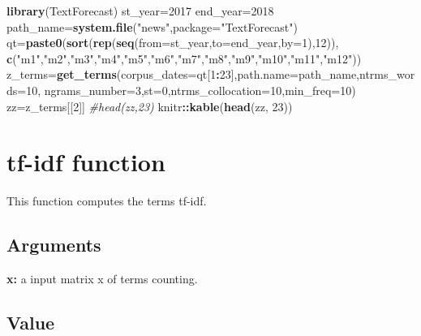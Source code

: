 \documentclass[]{article}
\newenvironment{Shaded}{\begin{snugshade}}{\end{snugshade}}
\newcommand{\KeywordTok}[1]{\textcolor[rgb]{0.13,0.29,0.53}{\textbf{#1}}}
\newcommand{\DataTypeTok}[1]{\textcolor[rgb]{0.13,0.29,0.53}{#1}}
\newcommand{\DecValTok}[1]{\textcolor[rgb]{0.00,0.00,0.81}{#1}}
\newcommand{\StringTok}[1]{\textcolor[rgb]{0.31,0.60,0.02}{#1}}
\newcommand{\CommentTok}[1]{\textcolor[rgb]{0.56,0.35,0.01}{\textit{#1}}}
\newcommand{\OperatorTok}[1]{\textcolor[rgb]{0.81,0.36,0.00}{\textbf{#1}}}
\newcommand{\NormalTok}[1]{#1}
\begin{document}
\begin{Shaded}
\begin{Highlighting}[]
\KeywordTok{library}\NormalTok{(TextForecast)}
\NormalTok{st_year=}\DecValTok{2017}
\NormalTok{end_year=}\DecValTok{2018}
\NormalTok{path_name=}\KeywordTok{system.file}\NormalTok{(}\StringTok{"news"}\NormalTok{,}\DataTypeTok{package=}\StringTok{"TextForecast"}\NormalTok{)}
\NormalTok{qt=}\KeywordTok{paste0}\NormalTok{(}\KeywordTok{sort}\NormalTok{(}\KeywordTok{rep}\NormalTok{(}\KeywordTok{seq}\NormalTok{(}\DataTypeTok{from=}\NormalTok{st_year,}\DataTypeTok{to=}\NormalTok{end_year,}\DataTypeTok{by=}\DecValTok{1}\NormalTok{),}\DecValTok{12}\NormalTok{)),}
\KeywordTok{c}\NormalTok{(}\StringTok{"m1"}\NormalTok{,}\StringTok{"m2"}\NormalTok{,}\StringTok{"m3"}\NormalTok{,}\StringTok{"m4"}\NormalTok{,}\StringTok{"m5"}\NormalTok{,}\StringTok{"m6"}\NormalTok{,}\StringTok{"m7"}\NormalTok{,}\StringTok{"m8"}\NormalTok{,}\StringTok{"m9"}\NormalTok{,}\StringTok{"m10"}\NormalTok{,}\StringTok{"m11"}\NormalTok{,}\StringTok{"m12"}\NormalTok{))}
\NormalTok{z_terms=}\KeywordTok{get_terms}\NormalTok{(}\DataTypeTok{corpus_dates=}\NormalTok{qt[}\DecValTok{1}\OperatorTok{:}\DecValTok{23}\NormalTok{],}\DataTypeTok{path.name=}\NormalTok{path_name,}\DataTypeTok{ntrms_words=}\DecValTok{10}\NormalTok{,}
\DataTypeTok{ngrams_number=}\DecValTok{3}\NormalTok{,}\DataTypeTok{st=}\DecValTok{0}\NormalTok{,}\DataTypeTok{ntrms_collocation=}\DecValTok{10}\NormalTok{,}\DataTypeTok{min_freq=}\DecValTok{10}\NormalTok{)}
\NormalTok{zz=z_terms[[}\DecValTok{2}\NormalTok{]]}
\CommentTok{#head(zz,23)}
\NormalTok{knitr}\OperatorTok{::}\KeywordTok{kable}\NormalTok{(}\KeywordTok{head}\NormalTok{(zz, }\DecValTok{23}\NormalTok{))}
\end{Highlighting}
\end{Shaded}

\section{tf-idf function}\label{tf-idf-function}

This function computes the terms tf-idf.

\subsection{Arguments}\label{arguments-3}

\textbf{x:} a input matrix x of terms counting.

\subsection{Value}\label{value-3}
\end{document}
